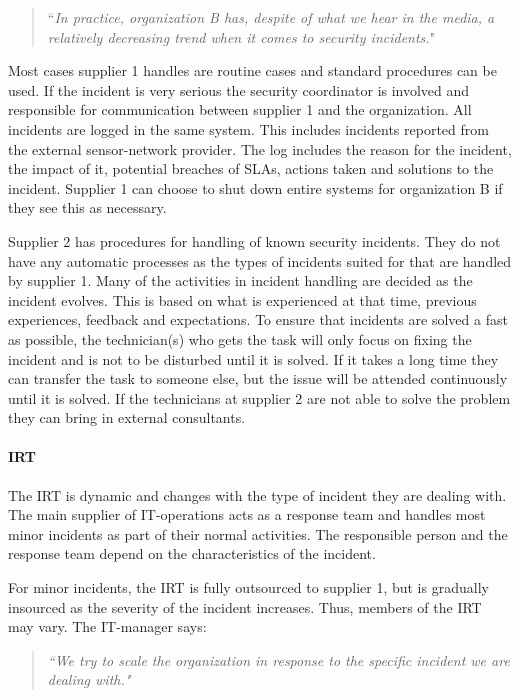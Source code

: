 \begin{quote}
``\textit{In practice, organization B has, despite of what we hear in the media, a relatively decreasing trend when it comes to security incidents.}"
\end{quote}

Most cases supplier 1 handles are routine cases and standard procedures can be used. If the incident is very serious the security coordinator is involved and responsible for communication between supplier 1 and the organization. All incidents are logged in the same system. This includes incidents reported from the external sensor-network provider. The log includes the reason for the incident, the impact of it, potential breaches of \acp{SLA}, actions taken and solutions to the incident. Supplier 1 can choose to shut down entire systems for organization B if they see this as necessary.

Supplier 2 has procedures for handling of known security incidents. They do not have any automatic processes as the types of incidents suited for that are handled by supplier 1. Many of the activities in incident handling are decided as the incident evolves. This is based on what is experienced at that time, previous experiences, feedback and expectations. To ensure that incidents are solved a fast as possible, the technician(s) who gets the task will only focus on fixing the incident and is not to be disturbed until it is solved. If it takes a long time they can transfer the task to someone else, but the issue will be attended continuously until it is solved. If the technicians at supplier 2 are not able to solve the problem they can bring in external consultants.

\paragraph{\acl{IRT}}
The \ac{IRT} is dynamic and changes with the type of incident they are dealing with. The main supplier of IT-operations acts as a response team and handles most minor incidents as part of their normal activities. The responsible person and the response team depend on the characteristics of the incident.   

For minor incidents, the \ac{IRT} is fully outsourced to supplier 1, but is gradually insourced as the severity of the incident increases. Thus, members of the \ac{IRT} may vary. The IT-manager says:
\begin{quote}
\textit{``We try to scale the organization in response to the specific incident we are dealing with."}
\end{quote}

